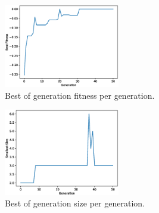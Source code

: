 \documentclass[11pt]{article}
\begin{document}
\begin{multicols}{2}
\centering
\begin{figure}[H]
\includegraphics[width=0.45\textwidth]{images/genetic_best_fitness2.eps}
\caption{Best of generation fitness per generation.}
\label{fig:best_fitness2}
\end{figure}
\begin{figure}[H]
\includegraphics[width=0.45\textwidth]{images/genetic_best_size2.eps}
\caption{Best of generation size per generation.}
\label{fig:best_size2}
\end{figure}
\end{multicols}
\end{document}
